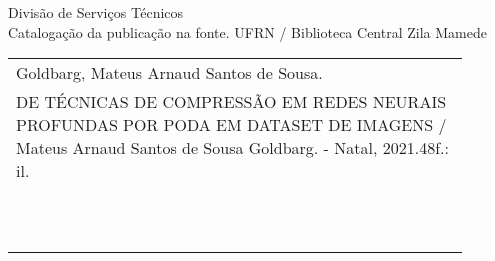 %
%

\newpage

\begin{center}

\vspace*{\fill}

Divisão de Serviços Técnicos\\[1ex]
Catalogação da publicação na fonte.
UFRN / Biblioteca Central Zila Mamede

\vspace{2ex}
\begin{tabular}{|p{0.9\linewidth}|} \hline
Goldbarg, Mateus Arnaud Santos de Sousa.
\\
 DE TÉCNICAS DE COMPRESSÃO EM REDES NEURAIS PROFUNDAS POR PODA EM DATASET DE IMAGENS / Mateus Arnaud Santos de Sousa Goldbarg. - Natal, 2021.48f.: il.
 \\

\hspace{1em}  \\


\hspace{1em} \\
\\
\hspace{1em}  \\
\hspace{1em}  \\
\\
\hspace{1em}  \\
\\
\hspace{1em}  \\
\\
\\ \hline
\end{tabular} 

\end{center}

